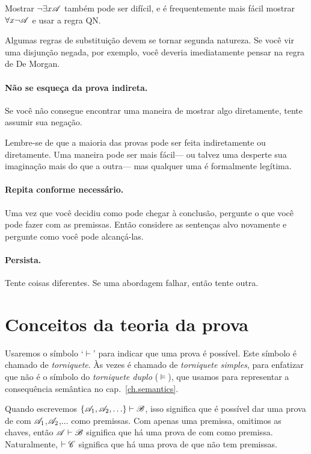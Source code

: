 Mostrar $\neg \exists x\mathscr{A}$ também pode ser difícil, e é frequentemente mais fácil mostrar  $\forall x\neg \mathscr{A}$ e usar a regra QN.

Algumas regras de substituição devem se tornar segunda natureza. Se você vir uma disjunção negada, por exemplo, você deveria imediatamente pensar na regra de De Morgan.

\paragraph{Não se esqueça da prova indireta.}
Se você não consegue encontrar uma maneira de mostrar algo diretamente, tente assumir sua negação.

Lembre-se de que a maioria das provas pode ser feita indiretamente ou diretamente. Uma maneira pode ser mais fácil--- ou talvez uma desperte sua imaginação mais do que a outra--- mas qualquer uma é formalmente legítima.

\paragraph{Repita conforme necessário.} Uma vez que você decidiu como pode chegar à conclusão, pergunte o que você pode fazer com as premissas. Então considere as sentenças alvo novamente e pergunte como você pode alcançá-las.

\paragraph{Persista.}
Tente coisas diferentes. Se uma abordagem falhar, então tente outra.




\section{Conceitos da teoria da prova}

Usaremos o símbolo `$\vdash$' para indicar que uma prova é possível. Este símbolo é chamado de \emph{torniquete}. Às vezes é chamado de \emph{torniquete simples}, para enfatizar que não é o símbolo do \emph{torniquete duplo} ($\models$), que usamos para representar a consequência semântica no cap.~\ref{ch.semantics}.

Quando escrevemos $\{\mathscr{A}_1,\mathscr{A}_2,\ldots\}\vdash\mathscr{B}$, isso significa que é possível dar uma prova de  com $\mathscr{A}_1$,$\mathscr{A}_2$,$\ldots$ como premissas. Com apenas uma premissa, omitimos as chaves, então $\mathscr{A}\vdash\mathscr{B}$ significa que há uma prova de  com  como premissa. Naturalmente, $\vdash\mathscr{C}$ significa que há uma prova de  que não tem premissas.

